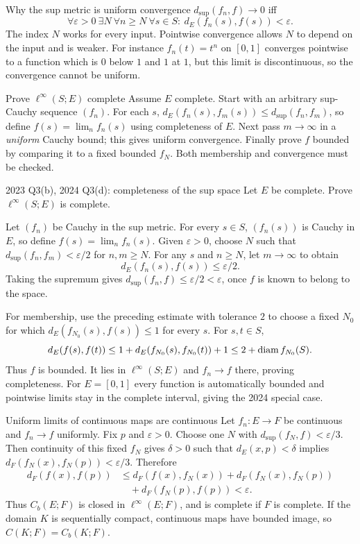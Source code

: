 \begin{note}{Why the sup metric is uniform convergence}
$d_{\sup}(f_n,f)\to0$ iff
\[\forall\varepsilon>0\ \exists N\ \forall n\ge N\ \forall s\in S:\ d_E(f_n(s),f(s))<\varepsilon.\]
The index $N$ works for every input. Pointwise convergence allows $N$ to depend on the input and is weaker. For instance $f_n(t)=t^n$ on $[0,1]$ converges pointwise to a function which is $0$ below $1$ and $1$ at $1$, but this limit is discontinuous, so the convergence cannot be uniform.
\end{note}
\begin{method}{Prove $\ell^\infty(S;E)$ complete}
Assume $E$ complete. Start with an arbitrary sup-Cauchy sequence $(f_n)$. For each $s$, $d_E(f_n(s),f_m(s))\le d_{\sup}(f_n,f_m)$, so define $f(s)=\lim_n f_n(s)$ using completeness of $E$. Next pass $m\to\infty$ in a \emph{uniform} Cauchy bound; this gives uniform convergence. Finally prove $f$ bounded by comparing it to a fixed bounded $f_N$. Both membership and convergence must be checked.
\end{method}
\begin{exam}{2023 Q3(b), 2024 Q3(d): completeness of the sup space}
Let $E$ be complete. Prove $\ell^\infty(S;E)$ is complete.
\end{exam}
\begin{answer}
Let $(f_n)$ be Cauchy in the sup metric. For every $s\in S$, $(f_n(s))$ is Cauchy in $E$, so define $f(s)=\lim_n f_n(s)$. Given $\varepsilon>0$, choose $N$ such that $d_{\sup}(f_n,f_m)<\varepsilon/2$ for $n,m\ge N$. For any $s$ and $n\ge N$, let $m\to\infty$ to obtain
\[d_E(f_n(s),f(s))\le\varepsilon/2.\]
Taking the supremum gives $d_{\sup}(f_n,f)\le\varepsilon/2<\varepsilon$, once $f$ is known to belong to the space.

For membership, use the preceding estimate with tolerance $2$ to choose a fixed $N_0$ for which $d_E(f_{N_0}(s),f(s))\le1$ for every $s$. For $s,t\in S$,
\[d_E(f(s),f(t))\le1+d_E(f_{N_0}(s),f_{N_0}(t))+1\le2+\operatorname{diam} f_{N_0}(S).\]
Thus $f$ is bounded. It lies in $\ell^\infty(S;E)$ and $f_n\to f$ there, proving completeness. For $E=[0,1]$ every function is automatically bounded and pointwise limits stay in the complete interval, giving the 2024 special case.
\end{answer}
\begin{note}{Uniform limits of continuous maps are continuous}
Let $f_n:E\to F$ be continuous and $f_n\to f$ uniformly. Fix $p$ and $\varepsilon>0$. Choose one $N$ with $d_{\sup}(f_N,f)<\varepsilon/3$. Then continuity of this fixed $f_N$ gives $\delta>0$ such that $d_E(x,p)<\delta$ implies $d_F(f_N(x),f_N(p))<\varepsilon/3$. Therefore
\begin{align*}
d_F(f(x),f(p))&\le d_F(f(x),f_N(x))+d_F(f_N(x),f_N(p))\\
&\quad+d_F(f_N(p),f(p))<\varepsilon.
\end{align*}
Thus $C_b(E;F)$ is closed in $\ell^\infty(E;F)$, and is complete if $F$ is complete. If the domain $K$ is sequentially compact, continuous maps have bounded image, so $C(K;F)=C_b(K;F)$.
\end{note}

